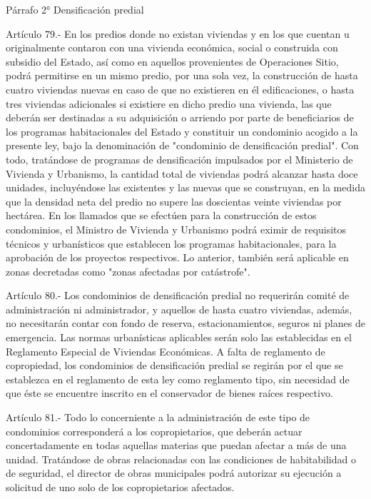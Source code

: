     Párrafo 2°
    Densificación predial

     
    Artículo 79.- En los predios donde no existan viviendas y en los que cuentan u originalmente contaron con una vivienda económica, social o construida con subsidio del Estado, así como en aquellos provenientes de Operaciones Sitio, podrá permitirse en un mismo predio, por una sola vez, la construcción de hasta cuatro viviendas nuevas en caso de que no existieren en él edificaciones, o hasta tres viviendas adicionales si existiere en dicho predio una vivienda, las que deberán ser destinadas a su adquisición o arriendo por parte de beneficiarios de los programas habitacionales del Estado y constituir un condominio acogido a la presente ley, bajo la denominación de "condominio de densificación predial".
    Con todo, tratándose de programas de densificación impulsados por el Ministerio de Vivienda y Urbanismo, la cantidad total de viviendas podrá alcanzar hasta doce unidades, incluyéndose las existentes y las nuevas que se construyan, en la medida que la densidad neta del predio no supere las doscientas veinte viviendas por hectárea.
    En los llamados que se efectúen para la construcción de estos condominios, el Ministro de Vivienda y Urbanismo podrá eximir de requisitos técnicos y urbanísticos que establecen los programas habitacionales, para la aprobación de los proyectos respectivos.
    Lo anterior, también será aplicable en zonas decretadas como "zonas afectadas por catástrofe".
     
    Artículo 80.- Los condominios de densificación predial no requerirán comité de administración ni administrador, y aquellos de hasta cuatro viviendas, además, no necesitarán contar con fondo de reserva, estacionamientos, seguros ni planes de emergencia. Las normas urbanísticas aplicables serán solo las establecidas en el Reglamento Especial de Viviendas Económicas.
    A falta de reglamento de copropiedad, los condominios de densificación predial se regirán por el que se establezca en el reglamento de esta ley como reglamento tipo, sin necesidad de que éste se encuentre inscrito en el conservador de bienes raíces respectivo.
   
    Artículo 81.- Todo lo concerniente a la administración de este tipo de condominios corresponderá a los copropietarios, que deberán actuar concertadamente en todas aquellas materias que puedan afectar a más de una unidad. Tratándose de obras relacionadas con las condiciones de habitabilidad o de seguridad, el director de obras municipales podrá autorizar su ejecución a solicitud de uno solo de los copropietarios afectados.

